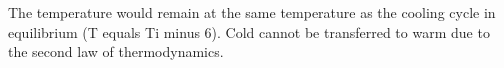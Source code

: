 The temperature would remain at the same temperature as the cooling cycle in equilibrium (T equals Ti minus 6).  
Cold cannot be transferred to warm due to the second law of thermodynamics.